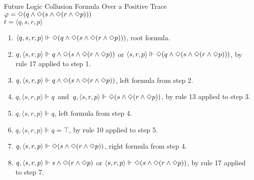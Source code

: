 \begin{myEx} Future Logic Collusion Formula Over a Positive Trace\\

\noindent
$\varphi = \Diamond(q \land \Diamond(s \land \Diamond(r \land \Diamond p)))$\\
$t = \langle q, s, r, p \rangle$\\

\begin{enumerate}
\item $\langle q,s,r,p \rangle \Vdash \Diamond(q \land \Diamond(s \land \Diamond(r \land \Diamond p)))$, root formula.\\ %

\item $q, \langle s,r,p \rangle \Vdash q \land \Diamond(s \land \Diamond(r \land \Diamond p))$ or $\langle s,r,p \rangle \Vdash \Diamond(q \land \Diamond(s \land \Diamond(r \land \Diamond p)))$, by rule 17 applied to step 1.\\ %

\item $q , \langle s,r,p \rangle \Vdash q \land \Diamond(s \land \Diamond(r \land \Diamond p))$, left formula from step 2.\\ %

\item $q , \langle s,r,p \rangle \Vdash q$\ and\ $q , \langle s,r,p \rangle \Vdash \Diamond(s \land \Diamond(r \land \Diamond p))$, by rule 13 applied to step 3.\\ %

\item $q , \langle s,r,p \rangle \Vdash q$, left formula from step 4.\\ %

\item $q , \langle s,r,p \rangle \Vdash q = \top$, by rule 10 applied to step 5.\\ %

\item $q, \langle s,r,p \rangle \Vdash \Diamond(s \land \Diamond(r \land \Diamond p))$, right formula from step 4.\\ %

\item $q, \langle s,r,p \rangle \Vdash s \land \Diamond(r \land \Diamond p)$ or $\langle s,r,p \rangle \Vdash \Diamond(s \land \Diamond(r \land \Diamond p))$, by rule 17 applied to step 7.\\ %


\end{enumerate}
\end{myEx}
